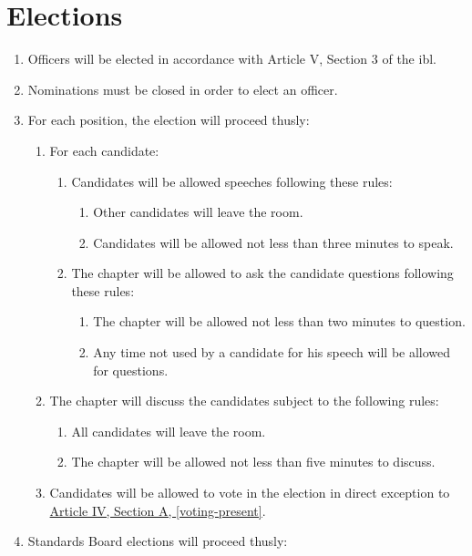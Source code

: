 \section{Elections}
	\label{elections}
	\begin{enumerate}
		\item Officers will be elected in accordance with Article V, Section 3 of the \gls{ibl}.
		\item Nominations must be closed in order to elect an officer.
		\item For each position, the election will proceed thusly:
			\begin{enumerate}
				\item For each candidate:
					\begin{enumerate}
						\item Candidates will be allowed speeches following
						these rules:
							\begin{enumerate}
								\item Other candidates will leave the room.
								\item Candidates will be allowed not less than
								three minutes to speak.
							\end{enumerate}
						\item The chapter will be allowed to ask the
						candidate questions following these rules:
							\begin{enumerate}
								\item The chapter will be allowed not less
								than two minutes to question.
								\item Any time not used by a candidate for his
								speech will be allowed for questions.
							\end{enumerate}
					\end{enumerate}
				\item The chapter will discuss the candidates subject to the
				following rules:
					\begin{enumerate}
						\item All candidates will leave the room.
						\item The chapter will be allowed not less than five
						minutes to discuss.
					\end{enumerate}
				\item Candidates will be allowed to vote in the election in direct exception to \hyperref[voting-present]{Article IV, Section A, \autoref*{voting-present}}. 
			\end{enumerate}
    \item Standards Board elections will proceed thusly:

\end{enumerate}
